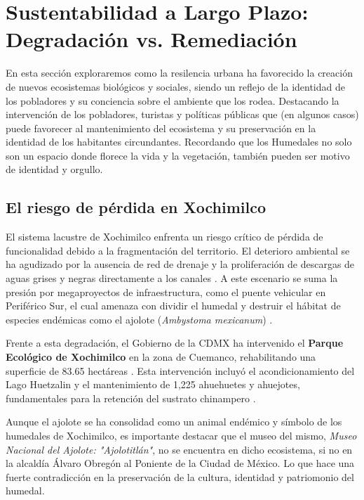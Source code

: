 
\section{Sustentabilidad a Largo Plazo: Degradación vs. Remediación}
En esta sección exploraremos como la resilencia urbana ha favorecido la creación de nuevos ecosistemas biológicos 
y sociales, siendo un reflejo de la identidad de los pobladores y su conciencia sobre el ambiente que los rodea. 
Destacando la intervención de los pobladores, turistas y políticas públicas que (en algunos casos) puede favorecer al 
mantenimiento del ecosistema y su preservación en la identidad de los habitantes circundantes. Recordando que los Humedales 
no solo son un espacio donde florece la vida y la vegetación, también pueden ser motivo de identidad y orgullo.

\subsection{El riesgo de pérdida en Xochimilco}

El sistema lacustre de Xochimilco enfrenta un riesgo crítico de pérdida de funcionalidad debido a la fragmentación del territorio. 
El deterioro ambiental se ha agudizado por la ausencia de red de drenaje y la proliferación de descargas de aguas grises y negras 
directamente a los canales \cite{rojas2020deterioro}. A este escenario se suma la presión por megaproyectos de infraestructura, 
como el puente vehicular en Periférico Sur, el cual amenaza con dividir el humedal y destruir el hábitat de especies endémicas como 
el ajolote (\textit{Ambystoma mexicanum}) \cite{segob2020proposicion}.

Frente a esta degradación, el Gobierno de la CDMX ha intervenido el \textbf{Parque Ecológico de Xochimilco} en la zona de Cuemanco, 
rehabilitando una superficie de 83.65 hectáreas \cite{sedema2022programa}. Esta intervención incluyó el acondicionamiento del Lago Huetzalin y 
el mantenimiento de 1,225 ahuehuetes y ahuejotes, fundamentales para la retención del sustrato chinampero \cite{sedema2022programa}.

Aunque el ajolote se ha consolidad como un animal endémico y símbolo de los humedales de Xochimilco, es importante destacar que el museo del mismo,
\textit{Museo Nacional del Ajolote: "Ajolotitlán"}, no se encuentra en dicho ecosistema, si no en la alcaldía Álvaro Obregón al Poniente de la 
Ciudad de México. Lo que hace una fuerte contradicción en la preservación de la cultura, identidad y patriomonio del humedal.

